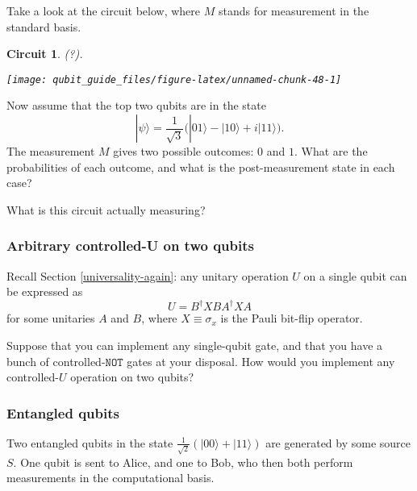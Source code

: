 \documentclass[fleqn]{article}
\newtheorem*{circuit}{Circuit}
\begin{document}
Take a look at the circuit below, where \(M\) stands for measurement in the standard basis.

\begin{circuit}

(?).

\begin{center}\texttt{[image: qubit\_guide\_files/figure-latex/unnamed-chunk-48-1]} \end{center}

\end{circuit}

Now assume that the top two qubits are in the state
\[
  |\psi\rangle
  = \frac{1}{\sqrt3}\big( |01\rangle - |10\rangle + i|11\rangle \big).
\]
The measurement \(M\) gives two possible outcomes: \(0\) and \(1\).
What are the probabilities of each outcome, and what is the post-measurement state in each case?

What is this circuit actually measuring?

\hypertarget{arbitrary-controlled-u-on-two-qubits}{%
\subsubsection{Arbitrary controlled-U on two qubits}\label{arbitrary-controlled-u-on-two-qubits}}

Recall Section \ref{universality-again}: any unitary operation \(U\) on a single qubit can be expressed as
\[
  U = B^\dagger XBA^\dagger XA
\]
for some unitaries \(A\) and \(B\), where \(X\equiv\sigma_x\) is the Pauli bit-flip operator.

Suppose that you can implement any single-qubit gate, and that you have a bunch of controlled-\(\texttt{NOT}\) gates at your disposal.
How would you implement any controlled-\(U\) operation on two qubits?

\hypertarget{entangled-qubits}{%
\subsubsection{Entangled qubits}\label{entangled-qubits}}

Two entangled qubits in the state \(\frac{1}{\sqrt{2}}(|00\rangle+|11\rangle)\) are generated by some source \(S\).
One qubit is sent to Alice, and one to Bob, who then both perform measurements in the computational basis.
\end{document}
